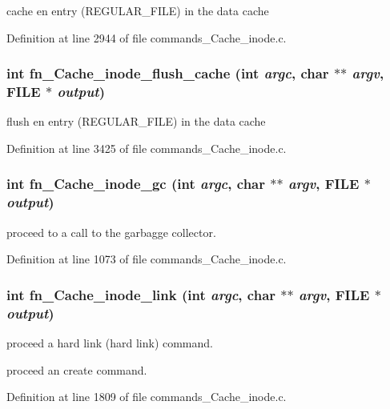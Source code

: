 cache en entry (REGULAR\_\-FILE) in the data cache 

Definition at line 2944 of file commands\_\-Cache\_\-inode.c.
\subsubsection[{fn\_\-Cache\_\-inode\_\-flush\_\-cache}]{\setlength{\rightskip}{0pt plus 5cm}int fn\_\-Cache\_\-inode\_\-flush\_\-cache (int {\em argc}, \/  char $\ast$$\ast$ {\em argv}, \/  FILE $\ast$ {\em output})}\label{commands_8h_096579b40ab0979f63b478dca8872192}


flush en entry (REGULAR\_\-FILE) in the data cache 

Definition at line 3425 of file commands\_\-Cache\_\-inode.c.
\subsubsection[{fn\_\-Cache\_\-inode\_\-gc}]{\setlength{\rightskip}{0pt plus 5cm}int fn\_\-Cache\_\-inode\_\-gc (int {\em argc}, \/  char $\ast$$\ast$ {\em argv}, \/  FILE $\ast$ {\em output})}\label{commands_8h_f9e30aa72007966403bac9988d4eed5b}


proceed to a call to the garbagge collector. 

Definition at line 1073 of file commands\_\-Cache\_\-inode.c.
\subsubsection[{fn\_\-Cache\_\-inode\_\-link}]{\setlength{\rightskip}{0pt plus 5cm}int fn\_\-Cache\_\-inode\_\-link (int {\em argc}, \/  char $\ast$$\ast$ {\em argv}, \/  FILE $\ast$ {\em output})}\label{commands_8h_29e45dc95b214393d1c59b7816f9e72d}


proceed a hard link (hard link) command.

proceed an create command. 

Definition at line 1809 of file commands\_\-Cache\_\-inode.c.

